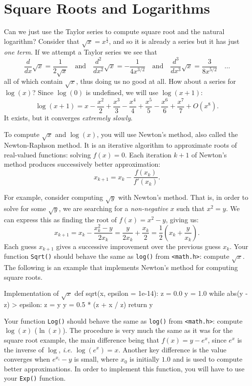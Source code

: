\section{Square Roots and Logarithms}\label{section:sqrtlog}

Can we just use the Taylor series to compute square root and the natural
logarithm? Consider that $\sqrt{x} = x^\frac{1}{2}$, and so it is
already a series but it has just \emph{one term}. If we attempt a Taylor series we see that
$$
\frac{d}{dx} \sqrt{x} = \frac{1}{2 \sqrt{x}}
\quad\text{and}\quad \frac{d^2}{dx^2} \sqrt{x} = -\frac{1}{4 x^{3/2}}
\quad\text{and}\quad \frac{d^3}{dx^3} \sqrt{x} = \frac{3}{8 x^{5/2}} \quad\ldots
$$
all of which contain $\sqrt{x}$, thus doing us no good at all.
How about a series for
$\log(x)$? Since $\log(0)$ is undefined, we will use $\log(x+1)$:
$$
\log(x+1) =
x-\frac{x^2}{2}+\frac{x^3}{3}-\frac{x^4}{4}+\frac{x^5}{5}-\frac{x^6}{6}+\frac{x^7}{7}+O\left(x^8\right).
$$
It exists, but it converges \emph{extremely slowly}.

To compute $\sqrt{x}$ and $\log(x)$, you will use Newton's method,
also called the Newton-Raphson method. It is an iterative algorithm
to approximate roots of real-valued functions:
solving $f(x) = 0$. Each iteration $k+1$ of Newton's method produces
successively better approximation:
\[
  x_{k+1} = x_k - \frac{f(x_k)}{f'(x_k)} .
\]

For example, consider computing $\sqrt{y}$  with Newton's method. That
is, in order to solve for some $\sqrt{y}$, we are searching for a \emph{non-negative} $x$
such that $x^2 = y$. We can express this as finding the root of $f(x) = x^2 -
y$, giving us:
\[
  x_{k+1} = x_k - \frac{x_k^2-y}{2x_k} = \frac{y}{2 x_k}+\frac{x_k}{2} = \frac{1}{2}\left( x_k + \frac{y}{x_k} \right).
\]
Each guess $x_{k+1}$ gives a successive improvement over the previous guess
$x_k$. Your function \texttt{Sqrt()} should behave the same as \texttt{log()}
from \texttt{<math.h>}: compute $\sqrt{x}$. The following is an example that
implements Newton's method for computing square roots.

\begin{pylisting}{Implementation of $\sqrt{x}$}
def sqrt(x, epsilon = 1e-14):
    z = 0.0
    y = 1.0
    while abs(y - z) > epsilon:
        z = y
        y = 0.5 * (z + x / z)
    return y
\end{pylisting}

Your function \texttt{Log()} should behave the same as \texttt{log()} from
\texttt{<math.h>}: compute $\log(x)$ ($\ln(x)$). The procedure is very much the
same as it was for the square root example, the main difference being that $f(x)
= y - e^x$, since $e^x$ is the inverse of $\log$, \textit{i.e.} $\log(e^x) = x$.
Another key difference is the value converges when $e^{x_{i}} - y$ is small,
where $x_0$ is initially $1.0$ and is used to compute better approximations. In
order to implement this function, you will have to use your \texttt{Exp()}
function.

